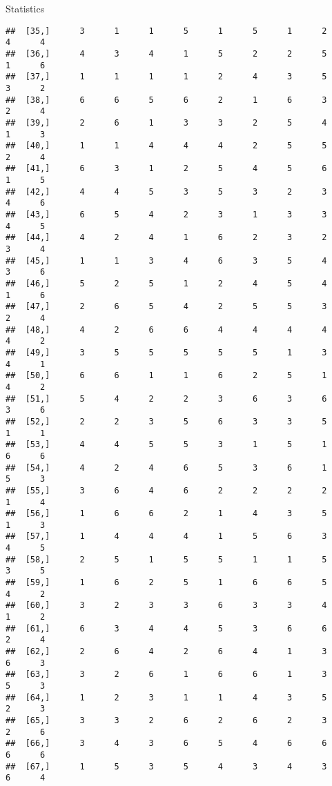 \documentclass[
  ignorenonframetext,
]{beamer}
\begin{document}
\begin{frame}[fragile]{Statistics}
\begin{verbatim}
##  [35,]      3      1      1      5      1      5      1      2      4      4
##  [36,]      4      3      4      1      5      2      2      5      1      6
##  [37,]      1      1      1      1      2      4      3      5      3      2
##  [38,]      6      6      5      6      2      1      6      3      2      4
##  [39,]      2      6      1      3      3      2      5      4      1      3
##  [40,]      1      1      4      4      4      2      5      5      2      4
##  [41,]      6      3      1      2      5      4      5      6      1      5
##  [42,]      4      4      5      3      5      3      2      3      4      6
##  [43,]      6      5      4      2      3      1      3      3      4      5
##  [44,]      4      2      4      1      6      2      3      2      3      4
##  [45,]      1      1      3      4      6      3      5      4      3      6
##  [46,]      5      2      5      1      2      4      5      4      1      6
##  [47,]      2      6      5      4      2      5      5      3      2      4
##  [48,]      4      2      6      6      4      4      4      4      4      2
##  [49,]      3      5      5      5      5      5      1      3      4      1
##  [50,]      6      6      1      1      6      2      5      1      4      2
##  [51,]      5      4      2      2      3      6      3      6      3      6
##  [52,]      2      2      3      5      6      3      3      5      1      1
##  [53,]      4      4      5      5      3      1      5      1      6      6
##  [54,]      4      2      4      6      5      3      6      1      5      3
##  [55,]      3      6      4      6      2      2      2      2      1      4
##  [56,]      1      6      6      2      1      4      3      5      1      3
##  [57,]      1      4      4      4      1      5      6      3      4      5
##  [58,]      2      5      1      5      5      1      1      5      3      5
##  [59,]      1      6      2      5      1      6      6      5      4      2
##  [60,]      3      2      3      3      6      3      3      4      1      2
##  [61,]      6      3      4      4      5      3      6      6      2      4
##  [62,]      2      6      4      2      6      4      1      3      6      3
##  [63,]      3      2      6      1      6      6      1      3      5      3
##  [64,]      1      2      3      1      1      4      3      5      2      3
##  [65,]      3      3      2      6      2      6      2      3      2      6
##  [66,]      3      4      3      6      5      4      6      6      6      6
##  [67,]      1      5      3      5      4      3      4      3      6      4

\end{verbatim}
\end{frame}
\end{document}
